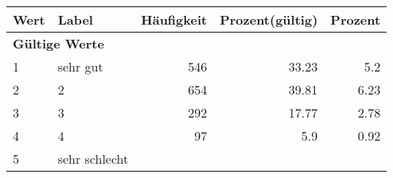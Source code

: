      \begin{longtable}{lXrrr}
     \toprule
     \textbf{Wert} & \textbf{Label} & \textbf{Häufigkeit} & \textbf{Prozent(gültig)} & \textbf{Prozent} \\
     \endhead
     \midrule
     \multicolumn{5}{l}{\textbf{Gültige Werte}}\\

     1 &
     \multicolumn{1}{X}{ sehr gut   } &


       \num{546} &
       \num[round-mode=places,round-precision=2]{33.23} &
         \num[round-mode=places,round-precision=2]{5.2} \\

     2 &
     \multicolumn{1}{X}{ 2   } &


       \num{654} &
       \num[round-mode=places,round-precision=2]{39.81} &
         \num[round-mode=places,round-precision=2]{6.23} \\

     3 &
     \multicolumn{1}{X}{ 3   } &


       \num{292} &
       \num[round-mode=places,round-precision=2]{17.77} &
         \num[round-mode=places,round-precision=2]{2.78} \\

     4 &
     \multicolumn{1}{X}{ 4   } &


       \num{97} &
       \num[round-mode=places,round-precision=2]{5.9} &
         \num[round-mode=places,round-precision=2]{0.92} \\

     5 &
     \multicolumn{1}{X}{ sehr schlecht   } &



\end{longtable}
